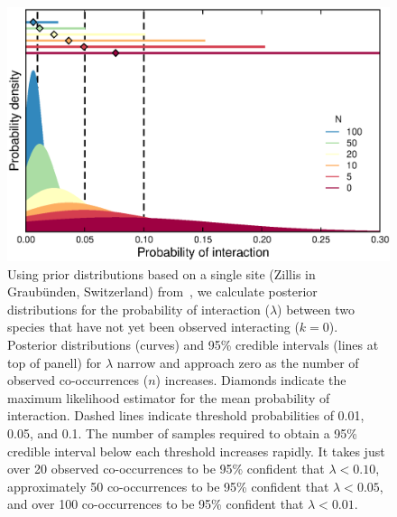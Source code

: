 \documentclass[12pt]{article}
\begin{document}
  \begin{figure}[h!]
    \caption{Using prior distributions based on a single site (Zillis in Graub\"{u}nden, Switzerland) from~\citet{Kopelke2017}, we calculate posterior distributions for the probability of interaction ($\lambda$) between two species that have not yet been observed interacting ($k = 0$). 
    Posterior distributions (curves) and 95\% credible intervals (lines at top of panell) for $\lambda$ narrow and approach zero as the number of observed co-occurrences ($n$) increases. Diamonds indicate the maximum likelihood estimator for the mean probability of interaction.
    Dashed lines indicate threshold probabilities of 0.01, 0.05, and 0.1. The number of samples required to obtain a 95\% credible interval below each threshold increases rapidly. It takes just over 20 observed co-occurrences to be 95\% confident that $\lambda<0.10$, approximately 50 co-occurrences to be 95\% confident that $\lambda<0.05$, and over 100 co-occurrences to be 95\% confident that $\lambda<0.01$.}
    \label{Salix_pdfs_cdfs}
    \begin{center}
    \includegraphics*[width=.8\textwidth]{figures/GP_pdfs_increasing_N_Zillis.eps}
    \end{center}
    \end{figure}
\end{document}
